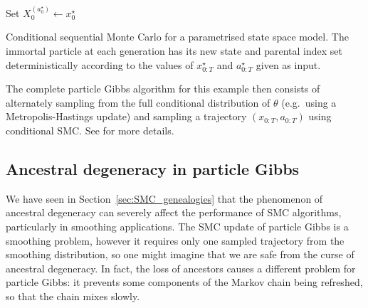 \begin{algorithm}[ht]
\vspace*{10pt}
\DontPrintSemicolon
{}
Set $X_0^{(a_0^\star)} \gets x_0^\star$\;
\vspace*{10pt}
\caption[Conditional sequential Monte Carlo]{Conditional sequential Monte Carlo for a parametrised state space model. The immortal particle at each generation has its new state and parental index set deterministically according to the values of $x_{0:T}^\star$ and $a_{0:T}^\star$ given as input.}
\label{alg:condSMC}
\end{algorithm}
The complete particle Gibbs algorithm for this example then consists of alternately sampling from the full conditional distribution of $\theta$ (e.g.\ using a Metropolis-Hastings update) and sampling a trajectory $(x_{0:T}, a_{0:T})$ using conditional SMC. See \textcite[Section 2.4.3]{andrieu2010} for more details.




\subsection{Ancestral degeneracy in particle Gibbs}
We have seen in Section~\ref{sec:SMC_genealogies} that the phenomenon of ancestral degeneracy can severely affect the performance of SMC algorithms, particularly in smoothing applications.
The SMC update of particle Gibbs is a smoothing problem, however it requires only one sampled trajectory from the smoothing distribution, so one might imagine that we are safe from the curse of ancestral degeneracy.
In fact, the loss of ancestors causes a different problem for particle Gibbs: it prevents some components of the Markov chain being refreshed, so that the chain mixes slowly.

